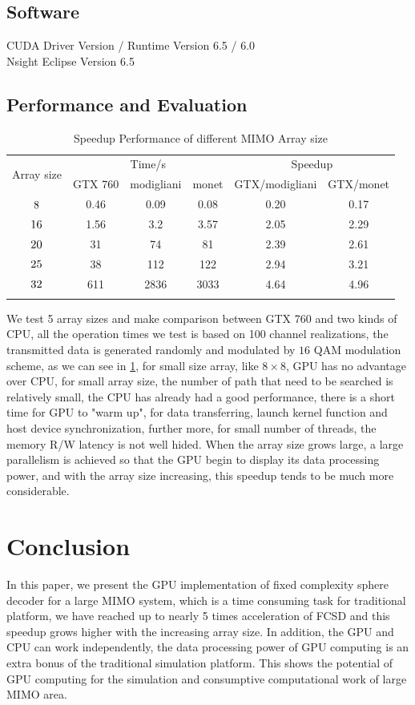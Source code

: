 \documentclass[12pt,a4paper,final]{article}
\begin{document}
\begin{spacing}{2.5}
\subsection{Software}
CUDA Driver Version / Runtime Version      6.5 / 6.0\\
Nsight Eclipse Version 6.5
\subsection{Performance and Evaluation}
\begin{table}[htb]
\caption{Speedup Performance of different MIMO Array size}
\centering
\begin{tabular}{|c|c|c|c|c|c|}
\hline
\multirow{2}{*}{ Array size} & \multicolumn{3}{|c|}{Time/s} & \multicolumn{2}{|c|}{Speedup}\\
\cline{2-6}
&GTX 760 & modigliani & monet & GTX/modigliani  & GTX/monet \\
\hline
$8\time 8$& 0.46& 0.09&0.08 & 0.20& 0.17\\
\hline
$16\time 16$&1.56 &3.2&3.57& 2.05& 2.29\\
\hline
$20\time 20$&31 & 74& 81& 2.39& 2.61\\
\hline
$25\time 25$& 38& 112& 122& 2.94& 3.21\\
\hline
$32\time 32$& 611&2836&3033&4.64& 4.96 \\
\hline
\label{speedup}
\end{tabular}
\end{table}
  \quad We test 5 array sizes and make comparison between GTX 760 and two kinds of CPU, all the operation times we test is based on 100 channel realizations, the transmitted data is generated randomly and modulated by $16$ QAM modulation scheme,  as we can see in \ref{speedup}, for small size array, like $8\times 8$, GPU has no advantage over CPU, for small array size, the number of path that need to be searched is relatively small, the CPU has already had a good performance, there is a short time for GPU to "warm up", for data transferring, launch kernel function and host device synchronization, further more, for small number of threads, the memory R/W latency is not well hided. When the array size grows large, a large parallelism is achieved so that the GPU begin to display its data processing power, and with the array size increasing, this speedup tends to be much more considerable.
\section{Conclusion}\label{conclusion}
In this paper, we present the GPU implementation of fixed complexity sphere decoder for a large MIMO system, which is a time consuming task for traditional platform, we have reached up to nearly 5 times acceleration of FCSD and this speedup grows higher with the increasing array size. In addition, the GPU and CPU can work independently, the data processing power of GPU computing is an extra bonus of the traditional simulation platform. This shows the potential of GPU computing for the simulation and consumptive computational work of large MIMO area.      



\end{spacing}
\end{document}
